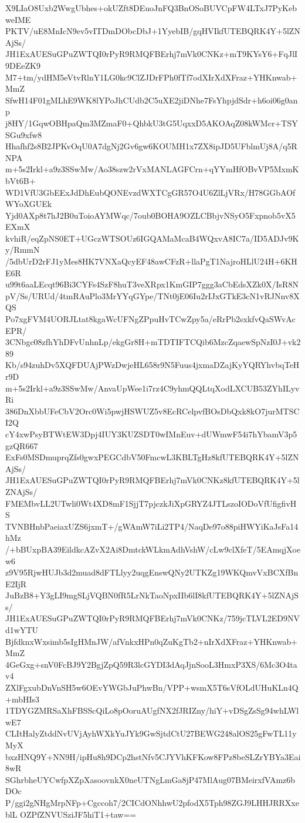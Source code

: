 X9LIaO8Uxb2WwgUbhes+okUZft8DEuoJnFQ3BnOSoBUVCpFW4LTxJ7PyKebweIME
PKTV/uE8MnIcN9ev5vITDmDObcDbJ+1YyebIB/gqHVIkfUTEBQRK4Y+5lZNAjSs/
JH1ExAUESuGPuZWTQI0rPyR9RMQFBErhj7mVk0CNKz+mT9KYsY6+FqJlI9DEeZK9
M7+tm/ydHM5eVtvRlnY1LG0kc9ClZJDrFPh0fTf7odXIrXdXFraz+YHKnwab+MmZ
SfwH14F01gMLhE9WK8lYPoJhCUdb2C5uXE2jiDNhe7FsYhpjdSdr+h6oi06g0anp
j8HY/1GqwOBHpaQm3MZmaF0+QhbkU3tG5UqxxD5AKOAqZ08kWMcr+TSYSGu9xfw8
Hhafhf2s8B2JPKvOqU0A7dgNj2Gv6gw6KOUMH1x7ZX8ipJD5UFblmUj8A/q5RNPA
m+5s2Irkl+a9z3SSwMw/Ao38szw2rVxMANLAGFCrn+qYYmHfOBvVP5MxmKbVt6B+
WD1VfU3GbEExJdDhEubQONEvzdWXTCgGR57O4U6ZlLjVRx/H78GGbAOfWYoXGUEk
Yjd0AXp8t7hJ2B0uToioAYMWqc/7oub0BOHA9OZLCBbjvNSyO5Fxpnob5vX5EXmX
kvhiR/eqZpNS0ET+UGczWTSOUz6IGQAMaMcaB4WQxvA8IC7a/ID5ADJv9Ky/RmmN
/5dbUrD2rFJ1yMes8HK7VNXaQcyEF48awCFzR+llaPgT1NajroHLlU24H+6KHE6R
u99t6aaLEcqt96Bi3CYFs4SzF8huT3veXRpx1KmGIP7ggg3aCbEdsXZk0X/IsR8N
pV/Ss/URUd/4tmRAuPlo3MrYYqGYpe/TNt0jE06Iu2rIJxGTkE3cN1vRJNnv8XQS
Po7xgFVM4UORJLtat8kgaWcUFNgZPpuHvTCwZpy5a/eRrPb2sxkfvQaSWvAcEPR/
3CNbgc08zfhYhDFvUnhnLp/ekgGr8H+mTDTIFTCQib6MzcZqaewSpNzI0J+vk289
Kb/s94zuhDv5XQFDUAjPWzDwjeHL658r9N5Fuus4jxmaDZajKyYQRYhvbqTeHr9D
m+5s2Irkl+a9z3SSwMw/AnvaUpWee1i7rz4C9yhmQQLtqXodLXCUB53ZYhILyvRi
386DnXbbUFeCbV2Orc0Wi5pwjHSWUZ5v8EcRCelpvfBOsDbQxk8kO7jurMTSCI2Q
cY4xwPsyBTWtEW3Dpj4IUY3KUZSDT0wIMnEuv+dUWmwF54i7hYbamV3p5gzQR667
ExFs0MSDmuprqZfs0gwxPEGCdbV50FmcwL3KBLTgHz8kfUTEBQRK4Y+5lZNAjSs/
JH1ExAUESuGPuZWTQI0rPyR9RMQFBErhj7mVk0CNKz8kfUTEBQRK4Y+5lZNAjSs/
FMEMbvLL2UTwli0Wt4XD8mF1SjjT7pjczkJiXpGRYZ4JTLszoIODoVfUfigfivHS
TVNBHnbPaeiaxUZS6jxmT+/gWAmW7iLi2TP4/NaqDe97o88piHWYiKaJsFa14hMz
/+bBUxpBA39EildkcAZvX2Ai8DmtckWLkmAdhVshW/cLw9clXfeT/5EAmqjXoew6
z9V95RjwHUJb3d2muad8dFTLlyy2uqgEnswQNy2UTKZg19WKQmvVxBCXfBnE2IjR
JuBzB8+Y3gLI9mgSLjVQBN0fR5LrNkTaoNpxIIb6lI8kfUTEBQRK4Y+5lZNAjSs/
JH1ExAUESuGPuZWTQI0rPyR9RMQFBErhj7mVk0CNKz/759jcTLVL2ED9NVd1wYTU
BjfdknxWxsimb5sIgHMnJW/afVnkxHPn0qZuKgTb2+nIrXdXFraz+YHKnwab+MmZ
4GeGxg+snV0FcBJ9Y2BgjZpQ59R3lcGYDI3dAqJjnSooL3HmxP3XS/6Mc3O4tav4
ZXlFgxubDnVnSH5w6OEvYWGbJuPhwBn/VPP+wsmX5T6sVfOLdUHuKLn4Q+mbHIs3
1TDYGZMRSaXhFBSScQiLo8pOoruAUgfNX2fJRIZny/hiY+vDSgZsSg94whLWlwE7
CLItHalyZtddNvUVjAyhWXkYuJYk9GwSjtdCtU27BEWG248alOS25gFwTL11yMyX
bxzHNQ9Y+NN9H/ipHu8h9DCp2hstNfv5CJYVhKFKow8FPz8beSLZrYBYa3Eai8wR
SGhrbheUYCwfpXZpXasoovnkX0neUTNgLmGa8jP47MlAug07BMeirxfVAmz6bDOc
P/ggi2gNHgMrpNFp+Cgccoh7/2CICdONhhwU2pfodX5Tph98ZGJ9LHHJRRXxeblL
OZPfZNVUSziJF5hiT1+taw==
